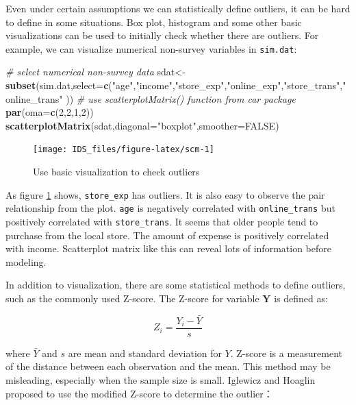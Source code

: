 \documentclass[12pt,]{krantz}
\newenvironment{Shaded}{\begin{snugshade}}{\end{snugshade}}
\newcommand{\KeywordTok}[1]{\textcolor[rgb]{0.13,0.29,0.53}{\textbf{{#1}}}}
\newcommand{\DataTypeTok}[1]{\textcolor[rgb]{0.13,0.29,0.53}{{#1}}}
\newcommand{\DecValTok}[1]{\textcolor[rgb]{0.00,0.00,0.81}{{#1}}}
\newcommand{\StringTok}[1]{\textcolor[rgb]{0.31,0.60,0.02}{{#1}}}
\newcommand{\CommentTok}[1]{\textcolor[rgb]{0.56,0.35,0.01}{\textit{{#1}}}}
\newcommand{\OtherTok}[1]{\textcolor[rgb]{0.56,0.35,0.01}{{#1}}}
\newcommand{\NormalTok}[1]{{#1}}
\theoremstyle{definition}
\theoremstyle{definition}
\theoremstyle{remark}
\begin{document}
Even under certain assumptions we can statistically define outliers, it
can be hard to define in some situations. Box plot, histogram and some
other basic visualizations can be used to initially check whether there
are outliers. For example, we can visualize numerical non-survey
variables in \texttt{sim.dat}:

\begin{Shaded}
\begin{Highlighting}[]
\CommentTok{# select numerical non-survey data}
\NormalTok{sdat<-}\KeywordTok{subset}\NormalTok{(sim.dat,}\DataTypeTok{select=}\KeywordTok{c}\NormalTok{(}\StringTok{"age"}\NormalTok{,}\StringTok{"income"}\NormalTok{,}\StringTok{"store_exp"}\NormalTok{,}\StringTok{"online_exp"}\NormalTok{,}\StringTok{"store_trans"}\NormalTok{,}\StringTok{"online_trans"} \NormalTok{))}
\CommentTok{# use scatterplotMatrix() function from car package}
\KeywordTok{par}\NormalTok{(}\DataTypeTok{oma=}\KeywordTok{c}\NormalTok{(}\DecValTok{2}\NormalTok{,}\DecValTok{2}\NormalTok{,}\DecValTok{1}\NormalTok{,}\DecValTok{2}\NormalTok{))}
\KeywordTok{scatterplotMatrix}\NormalTok{(sdat,}\DataTypeTok{diagonal=}\StringTok{"boxplot"}\NormalTok{,}\DataTypeTok{smoother=}\OtherTok{FALSE}\NormalTok{)}
\end{Highlighting}
\end{Shaded}

\begin{figure}

{\centering \texttt{[image: IDS\_files/figure-latex/scm-1]} 

}

\caption{Use basic visualization to check outliers}\label{fig:scm}
\end{figure}

As figure \ref{fig:scm} shows, \texttt{store\_exp} has outliers. It is
also easy to observe the pair relationship from the plot. \texttt{age}
is negatively correlated with \texttt{online\_trans} but positively
correlated with \texttt{store\_trans}. It seems that older people tend
to purchase from the local store. The amount of expense is positively
correlated with income. Scatterplot matrix like this can reveal lots of
information before modeling.

In addition to visualization, there are some statistical methods to
define outliers, such as the commonly used Z-score. The Z-score for
variable \(\mathbf{Y}\) is defined as:

\[Z_{i}=\frac{Y_{i}-\bar{Y}}{s}\]

where \(\bar{Y}\) and \(s\) are mean and standard deviation for \(Y\).
Z-score is a measurement of the distance between each observation and
the mean. This method may be misleading, especially when the sample size
is small. Iglewicz and Hoaglin proposed to use the modified Z-score to
determine the outlier\citep{mad1}：
\end{document}
